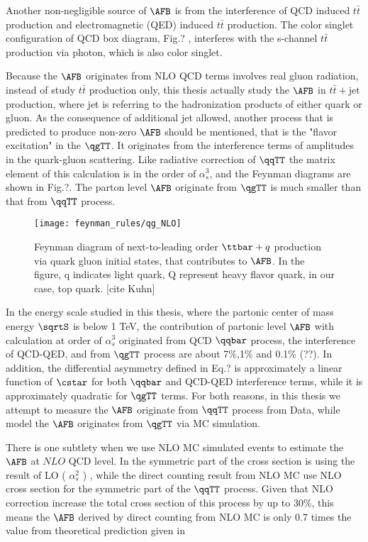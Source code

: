 Another non-negligible source of $\AFB$ is from the interference of QCD induced $t\bar t$ production and electromagnetic (QED) induced $t\bar t$ production. The color singlet configuration of QCD box diagram, Fig.? , interferes with the s-channel $t\bar t$ production via photon, which is also color singlet.

Because the $\AFB$ originates from NLO QCD terms involves real gluon radiation, instead of study $t\bar t$ production only, this thesis actually study the $\AFB$ in $t\bar t +\mathrm{jet}$ production, where jet is referring to the hadronization products of either quark or gluon. As the consequence of additional jet allowed, another process that is predicted to produce non-zero $\AFB$ should be mentioned, that is the "flavor excitation" in the $\qgTT$. It originates from the interference terms of amplitudes in the quark-gluon scattering. Like radiative correction of $\qqTT$ the matrix element of this calculation is in the order of $\alpha_s^3$, and the Feynman diagrams are shown in Fig.?. The parton level $\AFB$ originate from $\qgTT$ is much smaller than that from $\qqTT$ process.

\begin{figure}[hbt]
	\begin{center}
		\texttt{[image: feynman\_rules/qg\_NLO]}
		\caption{\small Feynman diagram of next-to-leading order $\ttbar+q$ production via quark gluon initial states, that contributes to $\AFB$. In the figure, q indicates light quark, Q represent heavy flavor quark, in our case, top quark. [cite Kuhn]}
		\label{fig:gg_tt_LO}
	\end{center}
\end{figure}

In the energy scale studied in this thesis, where the partonic center of mass energy $\sqrtS$ is below 1 TeV, the contribution of partonic level $\AFB$ with calculation at order of $\alpha_s^3$ originated from QCD $\qqbar$ process, the interference of QCD-QED, and from $\qgTT$ process are about 7\%,1\% and 0.1\% (??). In addition, the differential asymmetry defined in Eq.? is approximately a linear function of $\cstar$ for both $\qqbar$ and QCD-QED interference terms, while it is approximately quadratic for $\qgTT$ terms. For both reasons, in this thesis we attempt to measure the $\AFB$ originate from $\qqTT$ process from Data, while model the $\AFB$ originates from $\qgTT$ via MC simulation.

There is one subtlety when we use NLO MC simulated events to estimate the $\AFB$ at $NLO$ QCD level. In \cite{Kuhn&Rodrigus} the symmetric part of the cross section is using the result of LO ( $\alpha_s^2$ ) , while the direct counting result from NLO MC use NLO cross section for the symmetric part of the $\qqTT$ process.  Given that NLO correction increase the total cross section of this process by up to 30\%, this means the $\AFB$ derived by direct counting from NLO MC is only 0.7 times the value from theoretical prediction given in \cite{Kuhn&Rodrigus}               

